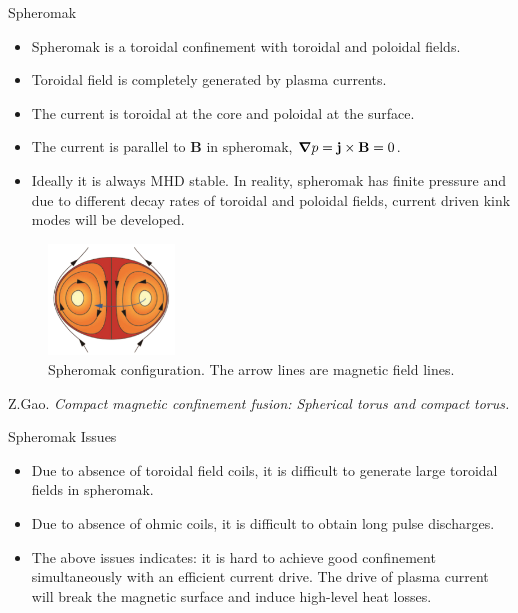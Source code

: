 \begin{frame} {Spheromak}
    \begin{itemize}
        \item Spheromak is a toroidal confinement with toroidal and poloidal fields.
        \item Toroidal field is completely generated by plasma currents.
        \item The current is toroidal at the core and poloidal at the surface.
        \item The current is parallel to $\mathbf{B}$ in spheromak, $\grad p = \mathbf{j\times B}=0$.
        \item Ideally it is always MHD stable. In reality, spheromak has finite pressure and due to different decay rates of toroidal and poloidal fields, current driven kink modes will be developed.
    \end{itemize}

    \begin{figure}
        \centering
        \includegraphics[width=0.3\textwidth]{figures/sphromak.png}
        \caption{Spheromak configuration. \cite{gao_2016_compact} The arrow lines are magnetic field lines.}
        \label{fig:spheromak}
    \end{figure}

    \tiny \cite{gao_2016_compact} Z.Gao. \textit{Compact magnetic confinement fusion: Spherical torus and compact torus.}
\end{frame}

\begin{frame} {Spheromak Issues \cite{gao_2016_compact}}
    \begin{itemize}
        \item Due to absence of toroidal field coils, it is difficult to generate large toroidal fields in spheromak.
        \item Due to absence of ohmic coils, it is difficult to obtain long pulse discharges.
        \item The above issues indicates: it is hard to achieve good confinement simultaneously with an efficient current drive. The drive of plasma current will break the magnetic surface and induce high-level heat losses.
    \end{itemize}
\end{frame}

